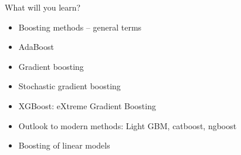 \documentclass[
  10pt,
  ignorenonframetext,
]{beamer}
\providecommand{\tightlist}{%
  \setlength{\itemsep}{0pt}\setlength{\parskip}{0pt}}
\begin{document}
\begin{frame}
\begin{block}{What will you learn?}
\protect\hypertarget{what-will-you-learn}{}
\(~\)

\begin{itemize}
\tightlist
\item
  Boosting methods -- general terms
\end{itemize}

\vspace{2mm}

\begin{itemize}
\tightlist
\item
  AdaBoost
\end{itemize}

\vspace{2mm}

\begin{itemize}
\tightlist
\item
  Gradient boosting
\end{itemize}

\vspace{2mm}

\begin{itemize}
\tightlist
\item
  Stochastic gradient boosting
\end{itemize}

\vspace{2mm}

\begin{itemize}
\tightlist
\item
  XGBoost: eXtreme Gradient Boosting
\end{itemize}

\vspace{2mm}

\begin{itemize}
\tightlist
\item
  Outlook to modern methods: Light GBM, catboost, ngboost
\end{itemize}

\vspace{2mm}

\begin{itemize}
\tightlist
\item
  Boosting of linear models
\end{itemize}
\end{block}
\end{frame}
\end{document}
